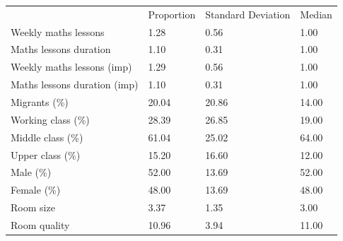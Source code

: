 \documentclass{article}
\begin{document}
\begin{table}[!h]
\centering
\begin{tabular}{llll}
\cline{1-4}
\multicolumn{1}{|l}{} &
  \multicolumn{1}{|l}{Proportion} &
  \multicolumn{1}{|l}{Standard Deviation} &
  \multicolumn{1}{|l|}{Median} \\
\cline{1-4}
\multicolumn{1}{|l}{Weekly maths lessons} &
  \multicolumn{1}{|l}{1.28} &
  \multicolumn{1}{|l}{0.56} &
  \multicolumn{1}{|l|}{1.00} \\
\cline{1-4}
\multicolumn{1}{|l}{Maths lessons duration} &
  \multicolumn{1}{|l}{1.10} &
  \multicolumn{1}{|l}{0.31} &
  \multicolumn{1}{|l|}{1.00} \\
\cline{1-4}
\multicolumn{1}{|l}{Weekly maths lessons (imp)} &
  \multicolumn{1}{|l}{1.29} &
  \multicolumn{1}{|l}{0.56} &
  \multicolumn{1}{|l|}{1.00} \\
\cline{1-4}
\multicolumn{1}{|l}{Maths lessons duration (imp)} &
  \multicolumn{1}{|l}{1.10} &
  \multicolumn{1}{|l}{0.31} &
  \multicolumn{1}{|l|}{1.00} \\
\cline{1-4}
\multicolumn{1}{|l}{Migrants (\%)} &
  \multicolumn{1}{|l}{20.04} &
  \multicolumn{1}{|l}{20.86} &
  \multicolumn{1}{|l|}{14.00} \\
\cline{1-4}
\multicolumn{1}{|l}{Working class (\%)} &
  \multicolumn{1}{|l}{28.39} &
  \multicolumn{1}{|l}{26.85} &
  \multicolumn{1}{|l|}{19.00} \\
\cline{1-4}
\multicolumn{1}{|l}{Middle class (\%)} &
  \multicolumn{1}{|l}{61.04} &
  \multicolumn{1}{|l}{25.02} &
  \multicolumn{1}{|l|}{64.00} \\
\cline{1-4}
\multicolumn{1}{|l}{Upper class (\%)} &
  \multicolumn{1}{|l}{15.20} &
  \multicolumn{1}{|l}{16.60} &
  \multicolumn{1}{|l|}{12.00} \\
\cline{1-4}
\multicolumn{1}{|l}{Male (\%)} &
  \multicolumn{1}{|l}{52.00} &
  \multicolumn{1}{|l}{13.69} &
  \multicolumn{1}{|l|}{52.00} \\
\cline{1-4}
\multicolumn{1}{|l}{Female (\%)} &
  \multicolumn{1}{|l}{48.00} &
  \multicolumn{1}{|l}{13.69} &
  \multicolumn{1}{|l|}{48.00} \\
\cline{1-4}
\multicolumn{1}{|l}{Room size} &
  \multicolumn{1}{|l}{3.37} &
  \multicolumn{1}{|l}{1.35} &
  \multicolumn{1}{|l|}{3.00} \\
\cline{1-4}
\multicolumn{1}{|l}{Room quality} &
  \multicolumn{1}{|l}{10.96} &
  \multicolumn{1}{|l}{3.94} &
  \multicolumn{1}{|l|}{11.00} \\
\cline{1-4}
\end{tabular}
\end{table}
\end{document}
